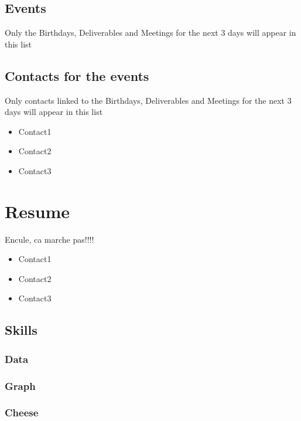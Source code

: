 \documentclass[8pt]{article} %
\begin{document}
\subsection{Events}
{\footnotesize
Only the Birthdays, Deliverables and Meetings for the next 3 days will appear in this list\\
}
{\footnotesize

}

\subsection{Contacts for the events}
{\footnotesize
Only contacts linked to the Birthdays, Deliverables and Meetings for the next 3 days will appear in this list\\

}
\begin{itemize}
  \item Contact1 
  \item Contact2 
  \item Contact3 
\end{itemize}

\section{Resume}
%
Encule, ca marche pas!!!!
\begin{itemize}
  \item Contact1 
  \item Contact2 
  \item Contact3 
\end{itemize}

\subsection{Skills}

{\footnotesize
\subsubsection{Data}

\subsubsection{Graph}

\subsubsection{Cheese}

}
\end{document}
